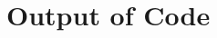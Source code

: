 \documentclass[useAMS,usenatbib]{mn2e}
\begin{document}
\section{Output of Code}\label{sec:output}


\end{document}
